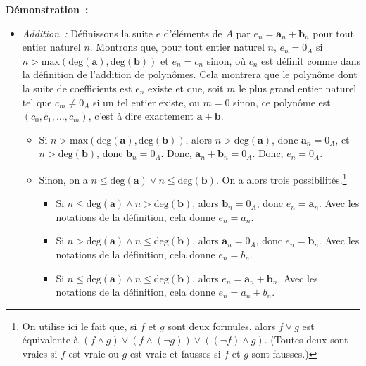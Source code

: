 \noindent\textbf{Démonstration :} 
\begin{itemize}[nosep]
    \item \textit{Addition :} 
        Définissons la suite $e$ d'éléments de $A$ par $e_n = \mathbf{a}_n + \mathbf{b}_n$ pour tout entier naturel $n$.
        Montrons que, pour tout entier naturel $n$, $e_n = 0_A$ si $n > \mathrm{max}(\mathrm{deg}(\mathbf{a}), \mathrm{deg}(\mathbf{b}))$ et $e_n = c_n$ sinon, où $c_n$ est définit comme dans la définition de l'addition de polynômes. 
        Cela montrera que le polynôme dont la suite de coefficients est $e_n$ existe et que, soit $m$ le plus grand entier naturel tel que $c_m \neq 0_A$ si un tel entier existe, ou $m = 0$ sinon, ce polynôme est $(c_0, c_1, \dots, c_m)$, c'est à dire exactement $\mathbf{a} + \mathbf{b}$.
        \begin{itemize}[nosep]
            \item Si $n > \mathrm{max}(\mathrm{deg}(\mathbf{a}), \mathrm{deg}(\mathbf{b}))$, alors $n > \mathrm{deg}(\mathbf{a})$, donc $\mathbf{a}_n = 0_A$, et $n > \mathrm{deg}(\mathbf{b})$, donc $\mathbf{b}_n = 0_A$.
                Donc, $\mathbf{a}_n + \mathbf{b}_n = 0_A$.
                Donc, $e_n = 0_A$.
            \item Sinon, on a $n \leq \mathrm{deg}(\mathbf{a}) \vee n \leq \mathrm{deg}(\mathbf{b})$. 
                On a alors trois possibilités.\footnote{
                    On utilise ici le fait que, si $f$ et $g$ sont deux formules, alors $f \vee g$ est équivalente à $(f \wedge g) \vee (f \wedge (\neg g)) \vee ((\neg f) \wedge g)$.
                    (Toutes deux sont vraies si $f$ est vraie ou $g$ est vraie et fausses si $f$ et $g$ sont fausses.)
                }
                \begin{itemize}[nosep]
                    \item Si $n \leq \mathrm{deg}(\mathbf{a}) \wedge n > \mathrm{deg}(\mathbf{b})$, alors $\mathbf{b}_n = 0_A$, donc $e_n = \mathbf{a}_n$. 
                        Avec les notations de la définition, cela donne $e_n = a_n$.
                    \item Si $n > \mathrm{deg}(\mathbf{a}) \wedge n \leq \mathrm{deg}(\mathbf{b})$, alors $\mathbf{a}_n = 0_A$, donc $e_n = \mathbf{b}_n$. 
                        Avec les notations de la définition, cela donne $e_n = b_n$.
                    \item Si $n \leq \mathrm{deg}(\mathbf{a}) \wedge n \leq \mathrm{deg}(\mathbf{b})$, alors $e_n = \mathbf{a}_n + \mathbf{b}_n$. 
                        Avec les notations de la définition, cela donne $e_n = a_n + b_n$.

\end{itemize}
\end{itemize}
\end{itemize}
